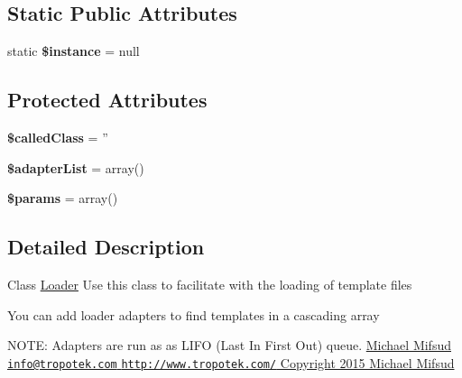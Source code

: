 \subsection*{Static Public Attributes}
\begin{DoxyCompactItemize}
\item 
\hypertarget{classDom_1_1Loader_a408a70ea86e42f29495720d48a6b4ce5}{static {\bfseries \$instance} = null}\label{classDom_1_1Loader_a408a70ea86e42f29495720d48a6b4ce5}

\end{DoxyCompactItemize}
\subsection*{Protected Attributes}
\begin{DoxyCompactItemize}
\item 
\hypertarget{classDom_1_1Loader_a3af8cd84bbc8e9650f6108ae8a327e0b}{{\bfseries \$called\+Class} = ''}\label{classDom_1_1Loader_a3af8cd84bbc8e9650f6108ae8a327e0b}

\item 
\hypertarget{classDom_1_1Loader_a1dbcefda4d58bfa2a63383d84df6a838}{{\bfseries \$adapter\+List} = array()}\label{classDom_1_1Loader_a1dbcefda4d58bfa2a63383d84df6a838}

\item 
\hypertarget{classDom_1_1Loader_a782d0ba0bb4a2e160bd013ef77bbc9f7}{{\bfseries \$params} = array()}\label{classDom_1_1Loader_a782d0ba0bb4a2e160bd013ef77bbc9f7}

\end{DoxyCompactItemize}


\subsection{Detailed Description}
Class \hyperlink{classDom_1_1Loader}{Loader} Use this class to facilitate with the loading of template files

You can add loader adapters to find templates in a cascading array

N\+O\+T\+E\+: Adapters are run as as L\+I\+F\+O (Last In First Out) queue. \hyperlink{}{Michael Mifsud \href{mailto:info@tropotek.com}{\tt info@tropotek.\+com}  \href{http://www.tropotek.com/}{\tt http\+://www.\+tropotek.\+com/}  Copyright 2015 Michael Mifsud }

